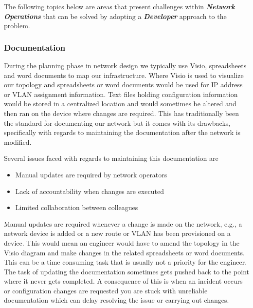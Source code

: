 \documentclass[12pt, letterpaper]{article}
\begin{document}
\smallskip

The following topics below are areas that present challenges within \textbf{\textit{Network Operations}} that can be solved by adopting a \textbf{\textit{Developer}} approach to the problem.

	\subsubsection{Documentation}
During the planning phase in network design we typically use Visio, spreadsheets and word documents to map our infrastructure. Where Visio is used to visualize our topology and spreadsheets or word documents would be used for IP address or VLAN assignment information. Text files holding configuration information would be stored in a centralized location and would sometimes be altered and then ran on the device where changes are required. This has traditionally been the standard for documenting our network but it comes with its drawbacks, specifically with regards to maintaining the documentation after the network is modified.

\vspace{0.1mm}

Several issues faced with regards to maintaining this documentation are

\begin{itemize}
\item Manual updates are required by network operators
\item Lack of accountability when changes are executed
\item Limited collaboration between colleagues
\end{itemize}


Manual updates are required whenever a change is made on the network, e.g., a \\ network device is added or a new route or VLAN has been provisioned on a device. This would mean an engineer would have to amend the topology in the Visio diagram and make changes in the related spreadsheets or word documents. This can be a time consuming task that is usually not a priority for the engineer. The task of updating the documentation sometimes gets pushed back to the point where it never gets completed. A consequence of this is when an incident occurs or configuration changes are requested you are stuck with unreliable documentation which can delay resolving the issue or carrying out changes.

\smallskip
\end{document}
